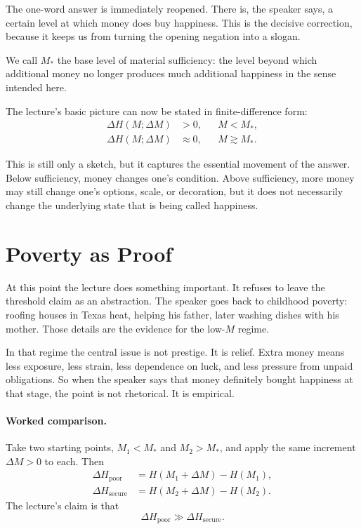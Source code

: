 The one-word answer is immediately reopened. There is, the speaker says, a certain level at which money does buy happiness. This is the decisive correction, because it keeps us from turning the opening negation into a slogan.

\begin{definition}
We call \(M_*\) the base level of material sufficiency: the level beyond which additional money no longer produces much additional happiness in the sense intended here.
\end{definition}

The lecture’s basic picture can now be stated in finite-difference form:
\begin{align}
\Delta H(M;\Delta M)&>0, && M<M_*,\\
\Delta H(M;\Delta M)&\approx 0, && M\gtrsim M_*.
\end{align}

This is still only a sketch, but it captures the essential movement of the answer. Below sufficiency, money changes one’s condition. Above sufficiency, more money may still change one’s options, scale, or decoration, but it does not necessarily change the underlying state that is being called happiness.

\section{Poverty as Proof}

At this point the lecture does something important. It refuses to leave the threshold claim as an abstraction. The speaker goes back to childhood poverty: roofing houses in Texas heat, helping his father, later washing dishes with his mother. Those details are the evidence for the low-\(M\) regime.

In that regime the central issue is not prestige. It is relief. Extra money means less exposure, less strain, less dependence on luck, and less pressure from unpaid obligations. So when the speaker says that money definitely bought happiness at that stage, the point is not rhetorical. It is empirical.

\paragraph{Worked comparison.}
Take two starting points, \(M_1<M_*\) and \(M_2>M_*\), and apply the same increment \(\Delta M>0\) to each. Then
\begin{align}
\Delta H_{\text{poor}} &= H(M_1+\Delta M)-H(M_1),\\
\Delta H_{\text{secure}} &= H(M_2+\Delta M)-H(M_2).
\end{align}
The lecture’s claim is that
\begin{equation}
\Delta H_{\text{poor}} \gg \Delta H_{\text{secure}}.
\end{equation}

